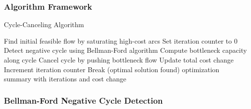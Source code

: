 \documentclass[12pt,a4paper]{article}
\begin{document}
\subsubsection{Algorithm Framework}

\begin{algorithm}[H]
\caption{Cycle-Canceling Algorithm}
\begin{algorithmic}[1]
\STATE Find initial feasible flow by saturating high-cost arcs
\STATE Set iteration counter to 0
    \STATE Detect negative cycle using Bellman-Ford algorithm
        \STATE Compute bottleneck capacity along cycle
        \STATE Cancel cycle by pushing bottleneck flow
        \STATE Update total cost change
        \STATE Increment iteration counter
    \ELSE
        \STATE Break (optimal solution found)
    \ENDIF
\ENDWHILE
\RETURN optimization summary with iterations and cost change
\end{algorithmic}
\end{algorithm}

\subsubsection{Bellman-Ford Negative Cycle Detection}
\end{document}
